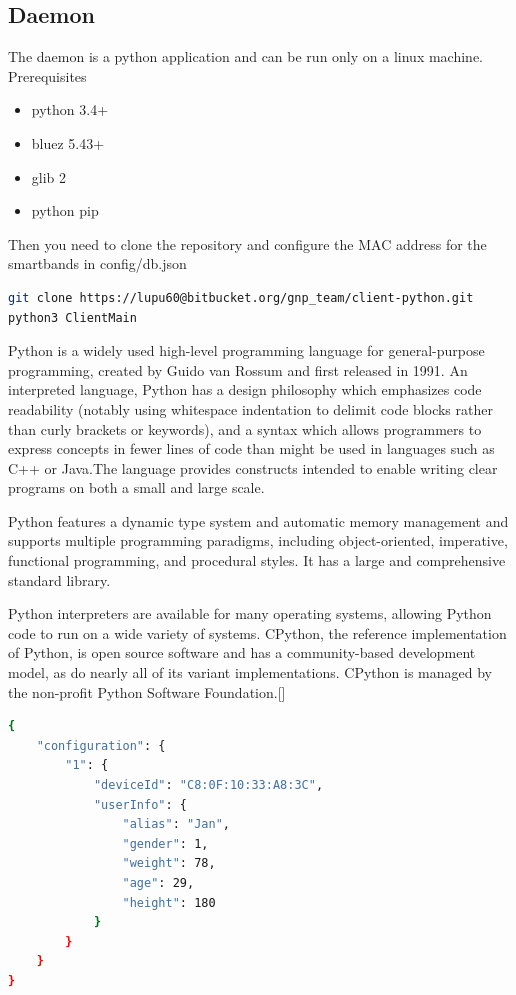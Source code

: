 \subsection{Daemon}
The daemon is a python application and can be run only on a linux machine.
Prerequisites
\begin{itemize}
	\item python 3.4+
    \item bluez 5.43+
	\item glib 2
	\item python pip
\end{itemize}
Then you need to clone the repository and configure the MAC address for the smartbands in config/db.json
\begin{lstlisting}[language=Bash]
git clone https://lupu60@bitbucket.org/gnp_team/client-python.git
python3 ClientMain
\end{lstlisting}
Python is a widely used high-level programming language for general-purpose programming, created by Guido van Rossum and first released in 1991. An interpreted language, Python has a design philosophy which emphasizes code readability (notably using whitespace indentation to delimit code blocks rather than curly brackets or keywords), and a syntax which allows programmers to express concepts in fewer lines of code than might be used in languages such as C++ or Java.The language provides constructs intended to enable writing clear programs on both a small and large scale.
\newline

Python features a dynamic type system and automatic memory management and supports multiple programming paradigms, including object-oriented, imperative, functional programming, and procedural styles. It has a large and comprehensive standard library.
\newline

Python interpreters are available for many operating systems, allowing Python code to run on a wide variety of systems. CPython, the reference implementation of Python, is open source software and has a community-based development model, as do nearly all of its variant implementations. CPython is managed by the non-profit Python Software Foundation.[\cite{6}]  
\begin{lstlisting}[language=Bash]
{
	"configuration": {
		"1": {
			"deviceId": "C8:0F:10:33:A8:3C",
			"userInfo": {
				"alias": "Jan",
				"gender": 1,
				"weight": 78,
				"age": 29,
				"height": 180
			}
		}
	}
}
\end{lstlisting}


